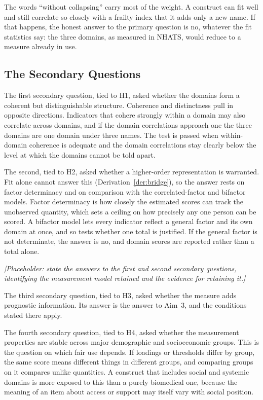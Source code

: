 The words ``without collapsing'' carry most of the weight. A construct can fit
well and still correlate so closely with a frailty index that it adds only a
new name. If that happens, the honest answer to the primary question is
no, whatever the fit statistics say: the three domains, as measured in NHATS,
would reduce to a measure already in use.

\subsection{The Secondary Questions}

The first secondary question, tied to H1, asked whether the domains form a
coherent but distinguishable structure. Coherence and distinctness pull in
opposite directions. Indicators that cohere strongly within a domain may also
correlate across domains, and if the domain correlations approach one the three
domains are one domain under three names. The test is passed when within-domain
coherence is adequate and the domain correlations stay clearly below the level at
which the domains cannot be told apart.

The second, tied to H2, asked whether a higher-order representation is
warranted. Fit alone cannot answer this (Derivation~\ref{der:bridge}), so the
answer rests on factor determinacy and on comparison with the correlated-factor
and bifactor models. Factor determinacy is how closely the estimated scores can
track the unobserved quantity, which sets a ceiling on how precisely any one
person can be scored. A bifactor model lets every indicator reflect a general
factor and its own domain at once, and so tests whether one total is justified. If the general factor is not determinate, the answer is no,
and domain scores are reported rather than a total alone.

\medskip
\noindent\emph{[Placeholder: state the answers to the first and second secondary questions, identifying the measurement model retained and the evidence for retaining it.]}

The third secondary question, tied to H3, asked whether the measure adds
prognostic information. Its answer is the answer to Aim~3, and the conditions
stated there apply.

The fourth secondary question, tied to H4, asked whether the measurement
properties are stable across major demographic and socioeconomic groups. This is
the question on which fair use depends. If loadings or thresholds differ by
group, the same score means different things in different groups, and comparing
groups on it compares unlike quantities. A construct that includes social and
systemic domains is more exposed to this than a purely biomedical one, because
the meaning of an item about access or support may itself vary with social
position.

